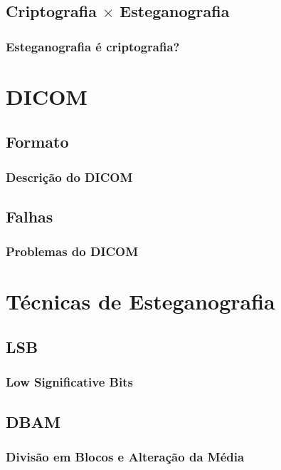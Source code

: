 \documentclass{beamer}
\begin{document}
\subsection{Criptografia $\times$ Esteganografia}
\begin{frame}
\frametitle{Esteganografia é criptografia?}

\end{frame}

\section{DICOM}
\subsection{Formato}
\begin{frame}
\frametitle{Descrição do DICOM}

\end{frame}


\subsection{Falhas}
\begin{frame}
\frametitle{Problemas do DICOM}

\end{frame}

\section{Técnicas de Esteganografia}
\subsection{LSB}
\begin{frame}
\frametitle{Low Significative Bits}

\end{frame}
\subsection{DBAM}
\begin{frame}
\frametitle{Divisão em Blocos e Alteração da Média}

\end{frame}
\end{document}
